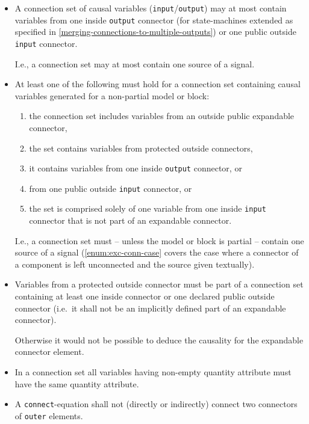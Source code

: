 \begin{itemize}
\item
  A connection set of causal variables (\lstinline!input!/\lstinline!output!) may at most contain variables from one inside \lstinline!output! connector (for state-machines extended as specified in \cref{merging-connections-to-multiple-outputs}) or one public outside \lstinline!input! connector.
  \begin{nonnormative}
  I.e., a connection set may at most contain one source of a signal.
  \end{nonnormative}
\item
  At least one of the following must hold for a connection set containing causal variables generated for a non-partial model or block:
\begin{enumerate}
\item
  the connection set includes variables from an outside public expandable connector,
\item
  the set contains variables from protected outside connectors,
\item
  it contains variables from one inside \lstinline!output! connector, or
\item
  from one public outside \lstinline!input! connector, or
\item\label{enum:exc-conn-case}%
  the  set is comprised solely of one variable from one inside \lstinline!input! connector that is not part of an expandable connector.
\end{enumerate}
\begin{nonnormative}
I.e., a connection set must -- unless the model or block is partial -- contain one source of a signal (\cref{enum:exc-conn-case} covers the case where a connector of a component is left unconnected and the source given textually).
\end{nonnormative}
\item
  Variables from a protected outside connector must be part of a connection set containing at least one inside connector or one declared public outside connector (i.e.\ it shall not be an implicitly defined part of an expandable connector).
  \begin{nonnormative}
  Otherwise it would not be possible to deduce the causality for the expandable connector element.
  \end{nonnormative}
\item
  In a connection set all variables having non-empty quantity attribute must have the same quantity attribute.
\item
  A \lstinline!connect!-equation shall not (directly or indirectly) connect two connectors of \lstinline!outer! elements.

\end{itemize}
